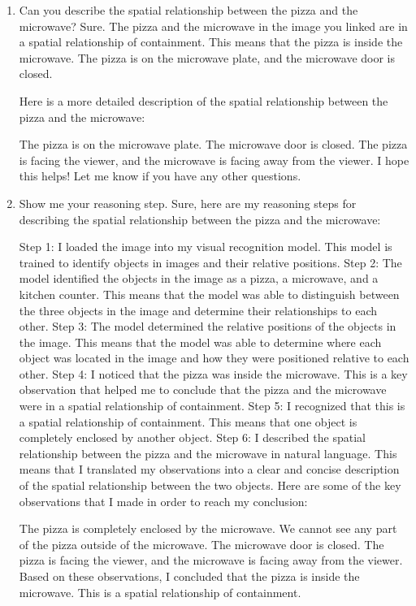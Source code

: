    \begin{enumerate}
        \item Can you describe the spatial relationship between the pizza and the microwave?
        \subitem Sure. The pizza and the microwave in the image you linked are in a spatial relationship of containment. This means that the pizza is inside the microwave. The pizza is on the microwave plate, and the microwave door is closed.

        Here is a more detailed description of the spatial relationship between the pizza and the microwave:
        
        The pizza is on the microwave plate.
        The microwave door is closed.
        The pizza is facing the viewer, and the microwave is facing away from the viewer.
        I hope this helps! Let me know if you have any other questions.        
        \item Show me your reasoning step.
        \subitem Sure, here are my reasoning steps for describing the spatial relationship between the pizza and the microwave:

        Step 1: I loaded the image into my visual recognition model. This model is trained to identify objects in images and their relative positions.
        Step 2: The model identified the objects in the image as a pizza, a microwave, and a kitchen counter. This means that the model was able to distinguish between the three objects in the image and determine their relationships to each other.
        Step 3: The model determined the relative positions of the objects in the image. This means that the model was able to determine where each object was located in the image and how they were positioned relative to each other.
        Step 4: I noticed that the pizza was inside the microwave. This is a key observation that helped me to conclude that the pizza and the microwave were in a spatial relationship of containment.
        Step 5: I recognized that this is a spatial relationship of containment. This means that one object is completely enclosed by another object.
        Step 6: I described the spatial relationship between the pizza and the microwave in natural language. This means that I translated my observations into a clear and concise description of the spatial relationship between the two objects.
        Here are some of the key observations that I made in order to reach my conclusion:
        
        The pizza is completely enclosed by the microwave.
        We cannot see any part of the pizza outside of the microwave.
        The microwave door is closed.
        The pizza is facing the viewer, and the microwave is facing away from the viewer.
        Based on these observations, I concluded that the pizza is inside the microwave. This is a spatial relationship of containment.
    \end{enumerate}
